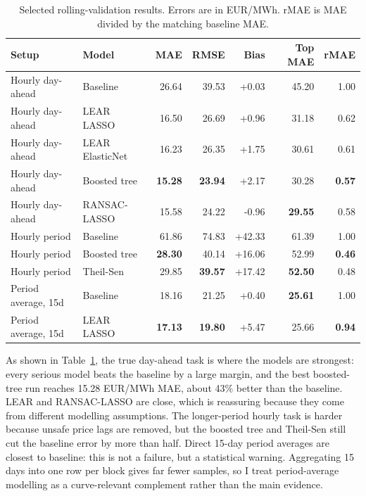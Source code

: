 \documentclass[10pt,a4paper]{article}
\begin{document}
\begin{table}[h]
\centering
\scriptsize
\begin{tabular}{llrrrrr}
\toprule
Setup & Model & MAE & RMSE & Bias & Top MAE & rMAE \\
\midrule
Hourly day-ahead & Baseline & 26.64 & 39.53 & +0.03 & 45.20 & 1.00 \\
Hourly day-ahead & LEAR LASSO & 16.50 & 26.69 & +0.96 & 31.18 & 0.62 \\
Hourly day-ahead & LEAR ElasticNet & 16.23 & 26.35 & +1.75 & 30.61 & 0.61 \\
Hourly day-ahead & Boosted tree & \textbf{15.28} & \textbf{23.94} & +2.17 & 30.28 & \textbf{0.57} \\
Hourly day-ahead & RANSAC-LASSO & 15.58 & 24.22 & -0.96 & \textbf{29.55} & 0.58 \\
\midrule
Hourly period & Baseline & 61.86 & 74.83 & +42.33 & 61.39 & 1.00 \\
Hourly period & Boosted tree & \textbf{28.30} & 40.14 & +16.06 & 52.99 & \textbf{0.46} \\
Hourly period & Theil-Sen & 29.85 & \textbf{39.57} & +17.42 & \textbf{52.50} & 0.48 \\
\midrule
Period average, 15d & Baseline & 18.16 & 21.25 & +0.40 & \textbf{25.61} & 1.00 \\
Period average, 15d & LEAR LASSO & \textbf{17.13} & \textbf{19.80} & +5.47 & 25.66 & \textbf{0.94} \\
\bottomrule
\end{tabular}
\caption{Selected rolling-validation results. Errors are in EUR/MWh. rMAE is MAE divided by the matching baseline MAE.}
\label{tab:validation-results}
\end{table}

As shown in Table~\ref{tab:validation-results}, the true day-ahead task is where the models are strongest: every serious model beats the baseline by a large margin, and the best boosted-tree run reaches 15.28 EUR/MWh MAE, about 43\% better than the baseline. LEAR and RANSAC-LASSO are close, which is reassuring because they come from different modelling assumptions. The longer-period hourly task is harder because unsafe price lags are removed, but the boosted tree and Theil-Sen still cut the baseline error by more than half. Direct 15-day period averages are closest to baseline: this is not a failure, but a statistical warning. Aggregating 15 days into one row per block gives far fewer samples, so I treat period-average modelling as a curve-relevant complement rather than the main evidence.
\end{document}
